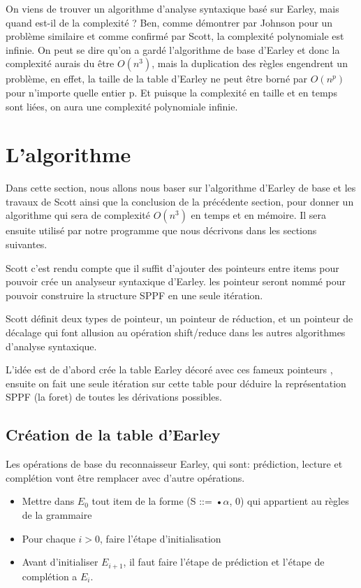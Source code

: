 \documentclass[10pt]{report}
\begin{document}
On viens de trouver un algorithme d'analyse syntaxique basé sur Earley, mais quand est-il de la complexité ? Ben, comme démontrer par Johnson\cite{Johnson} pour un problème similaire et comme confirmé par Scott\cite{Scott}, la complexité polynomiale est infinie. On peut se dire qu'on a gardé l'algorithme de base d'Earley et donc la complexité aurais du être $O(n^3)$, mais la duplication des règles engendrent un problème, en effet, la taille de la table d'Earley ne peut être borné par $O(n^p)$ pour n'importe quelle entier p. Et puisque la complexité en taille et en temps sont liées, on aura une complexité polynomiale infinie.

\chapter{L'algorithme}
Dans cette section, nous allons nous baser sur l'algorithme d'Earley de base et les travaux de Scott\cite{Scott} ainsi que la conclusion de la précédente section, pour donner un algorithme qui sera de complexité $O(n^3)$ en temps et en mémoire. Il sera ensuite utilisé par notre programme que nous décrivons dans les sections suivantes.

Scott c'est rendu compte que il suffit d'ajouter des pointeurs entre items pour pouvoir crée un analyseur syntaxique d'Earley. les pointeur seront nommé pour pouvoir construire la structure SPPF en une seule itération. 

Scott définit deux types de pointeur, un pointeur de réduction, et un pointeur de décalage qui font allusion au opération shift/reduce dans les autres algorithmes d'analyse syntaxique.

L'idée est de d'abord crée la table Earley décoré avec ces fameux pointeurs , ensuite on fait une seule itération sur cette table pour déduire la représentation SPPF (la foret) de toutes les dérivations possibles.

\section{Création de la table d'Earley}
Les opérations de base du reconnaisseur Earley, qui sont: prédiction, lecture et complétion vont être remplacer avec d'autre opérations.

\begin{itemize}
	\item Mettre dans $E_0$ tout item de la forme (S ::= •$\alpha$, 0) qui appartient au règles de la grammaire
	\item Pour chaque $i > 0$, faire l'étape d'initialisation 
	\item Avant d'initialiser $E_{i+1}$, il faut faire l'étape de prédiction et l'étape de complétion a $E_{i}$.
\end{itemize}
\end{document}

